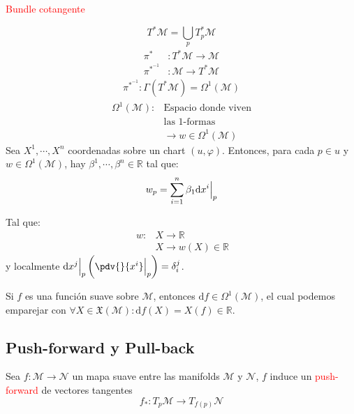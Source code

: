 \documentclass[../main]{subfiles}
\begin{document}
\begin{minipage}[t]{0.5\textwidth}
    \centerline{\textcolor{red}{Bundle cotangente}}
    \begin{equation*}
        T^{*}\mathcal{M}=\bigcup_p T^{*}_p \mathcal{M}
    \end{equation*}
    \vspace{-0.7cm}
    \begin{align*}
        \pi^{*}&: T^{*}\mathcal{M} \rightarrow \mathcal{M} \\
        \pi^{*^{-1}}&: \mathcal{M} \rightarrow T^{*}\mathcal{M}
    \end{align*}
    \vspace{-0.9cm}
    \begin{align*}
        \pi^{*^{-1}}: \Gamma(T^{*}\mathcal{M})=\Omega^1(\mathcal{M})
    \end{align*}
    \vspace{-0.9cm}
    \begin{align*}
         \Omega^1(\mathcal{M}): &\text{Espacio donde viven}\\
         &\text{las 1-formas}\\
         &\rightarrow w \in \Omega^1(\mathcal{M})
    \end{align*}
    Sea $X^1, \cdots, X^n$ coordenadas sobre un chart $(u, \varphi)$. Entonces, para cada $p \in u$ y $w \in \Omega^1(\mathcal{M})$, hay $\beta^1, \cdots, \beta^n \in \mathbb{R}$ tal que:
    \begin{equation*}
        w_p=\sum_{i=1}^n \beta_1 \mathrm{d}x^{i}\Big{|}_p
    \end{equation*}
\end{minipage}

Tal que:
\begin{align*}
    \ w: &X \rightarrow \mathbb{R} \\
    &X \rightarrow w(X) \in \mathbb{R}
\end{align*}
y localmente $\mathrm{d}x^{j}\Big{|}_p \left(\pdv{}{x^{i}}\Big{|}_p\right)=\delta^j_i$.

\ejemplo{} Si $f$ es una función suave sobre $\mathcal{M}$, entonces $\mathrm{d}f \in \Omega^1(\mathcal{M})$, el cual podemos emparejar con $\forall X \in \mathfrak{X}(\mathcal{M}): \mathrm{d}f(X)=X(f) \in \mathbb{R}$.

\subsection{Push-forward y Pull-back}
Sea $f: \mathcal{M}\rightarrow \mathcal{N}$ un mapa suave entre las manifolds $\mathcal{M}$ y $\mathcal{N}$, $f$ induce un \textcolor{red}{push-forward} de vectores tangentes
\begin{equation}
    f_{*}: T_p \mathcal{M} \rightarrow T_{f(p)}\mathcal{N}
\end{equation}
\end{document}
